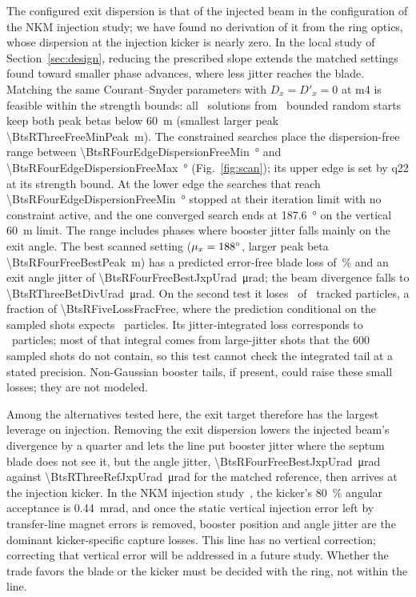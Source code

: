 \documentclass[final,5p,twocolumn]{elsarticle}
\begin{document}
The configured exit dispersion is that of the injected beam in the configuration of
the NKM injection study; we have found no derivation of it from the ring optics,
whose dispersion at the injection kicker is nearly zero. In the local study of
Section~\ref{sec:design}, reducing the prescribed slope extends the matched settings
found toward smaller phase advances, where less jitter reaches the blade. Matching the same
Courant--Snyder parameters with $D_x=D'_x=0$ at m4 is feasible within the strength
bounds: all \BtsRThreeFreeWithin\ solutions from \BtsRThreeFreeStarts\ bounded random starts keep both peak
betas below \SI{60}{\metre} (smallest larger peak \SI{\BtsRThreeFreeMinPeak}{\metre}). The constrained searches
place the dispersion-free range between \SI{\BtsRFourEdgeDispersionFreeMin}{\degree} and \SI{\BtsRFourEdgeDispersionFreeMax}{\degree}
(Fig.~\ref{fig:scan}); its upper edge is set by q22 at its strength bound. At the lower
edge the searches that reach \SI{\BtsRFourEdgeDispersionFreeMin}{\degree} stopped at their iteration limit
with no constraint active, and the one converged search ends at \SI{187.6}{\degree} on the
vertical \SI{60}{\metre} limit. The range
includes phases where booster jitter falls mainly on the exit angle. The best scanned
setting ($\mu_x=\SI{188}{\degree}$, larger peak beta \SI{\BtsRFourFreeBestPeak}{\metre}) has a
predicted error-free blade loss of \BtsRFourFreeBestLossPct\,\si{\percent} and an exit angle jitter of
\SI{\BtsRFourFreeBestJxpUrad}{\micro\radian}; the beam divergence falls to \SI{\BtsRThreeBetDivUrad}{\micro\radian}. On the second
test it loses \BtsRFiveLostFree\ of \BtsRFiveParticles\ tracked particles, a fraction of \num{\BtsRFiveLossFracFree}, where the
prediction conditional on the sampled shots expects \BtsRFiveExpFree\ particles. Its
jitter-integrated loss corresponds to \BtsRFiveIntegrCountFree\ particles; most of that integral comes
from large-jitter shots that the 600 sampled shots do not contain, so this test cannot
check the integrated tail at a stated precision. Non-Gaussian booster tails, if
present, could raise these small losses; they are not modeled.

Among the alternatives tested here, the exit target therefore has the largest
leverage on injection. Removing the exit dispersion lowers the injected beam's divergence by a
quarter and lets the line put booster jitter where the septum blade does not see
it, but the angle jitter, \SI{\BtsRFourFreeBestJxpUrad}{\micro\radian} against
\SI{\BtsRThreeRefJxpUrad}{\micro\radian} for the matched reference, then arrives at the
injection kicker. In the NKM injection study~\cite{ParkNKM2026}, the kicker's \SI{80}{\percent} angular acceptance is \SI{0.44}{\milli\radian}, and once the static
vertical injection error left by transfer-line magnet errors is removed, booster position
and angle jitter are the dominant kicker-specific capture losses. This line has no
vertical correction; correcting that vertical error will be addressed in a future study.
Whether the trade favors the blade or the kicker must be decided with the ring, not
within the line.
\end{document}
